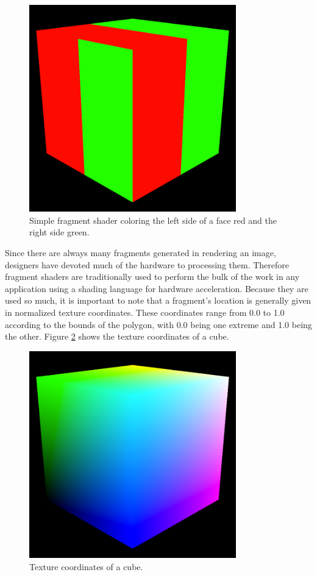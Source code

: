 \documentclass{report}
\begin{document}
\begin{figure}
\centering
\includegraphics[width=0.8\textwidth]{xmas.png}
\caption{Simple fragment shader coloring the left side of a face red and the
right side green.}
\label{fig:xmas}
\end{figure}

Since there are always many fragments generated in rendering an image, designers
have devoted much of the hardware to processing them.  Therefore fragment
shaders are traditionally used to perform the bulk of the work in any
application using a shading language for hardware acceleration.  Because they
are used so much, it is important to note that a fragment’s location is
generally given in normalized texture coordinates.  These coordinates range from
0.0 to 1.0 according to the bounds of the polygon, with 0.0 being one extreme
and 1.0 being the other.  Figure \ref{fig:coords} shows the texture coordinates
of a cube.

\begin{figure}
\centering
\includegraphics[width=0.8\textwidth]{coords.png}
\caption{Texture coordinates of a cube.}
\label{fig:coords}
\end{figure}
\end{document}
